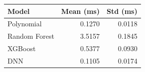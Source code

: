 \begin{tabular}{lrr}
\toprule
Model & Mean (ms) & Std (ms) \\ \midrule
Polynomial & 0.1270 & 0.0118 \\
Random Forest & 3.5157 & 0.1845 \\
XGBoost & 0.5377 & 0.0930 \\
DNN & 0.1105 & 0.0174 \\
\bottomrule
\end{tabular}